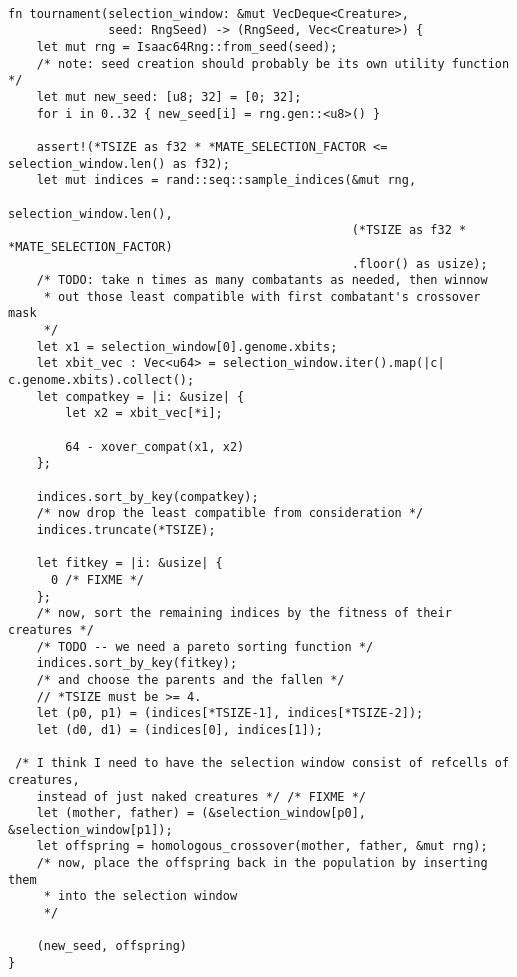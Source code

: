 \documentclass[11pt]{article}
\begin{document}
\lstset{language=rust,label=org98dc541,caption= ,captionpos=b,numbers=none}
\begin{lstlisting}

fn tournament(selection_window: &mut VecDeque<Creature>,
              seed: RngSeed) -> (RngSeed, Vec<Creature>) {
    let mut rng = Isaac64Rng::from_seed(seed);
    /* note: seed creation should probably be its own utility function */
    let mut new_seed: [u8; 32] = [0; 32];
    for i in 0..32 { new_seed[i] = rng.gen::<u8>() }

    assert!(*TSIZE as f32 * *MATE_SELECTION_FACTOR <= selection_window.len() as f32);
    let mut indices = rand::seq::sample_indices(&mut rng,
                                                selection_window.len(),
                                                (*TSIZE as f32 * *MATE_SELECTION_FACTOR)
                                                .floor() as usize);
    /* TODO: take n times as many combatants as needed, then winnow
     * out those least compatible with first combatant's crossover mask
     */
    let x1 = selection_window[0].genome.xbits;
    let xbit_vec : Vec<u64> = selection_window.iter().map(|c| c.genome.xbits).collect();
    let compatkey = |i: &usize| {
        let x2 = xbit_vec[*i];

        64 - xover_compat(x1, x2)
    };

    indices.sort_by_key(compatkey);
    /* now drop the least compatible from consideration */
    indices.truncate(*TSIZE);

    let fitkey = |i: &usize| {
      0 /* FIXME */
    };
    /* now, sort the remaining indices by the fitness of their creatures */
    /* TODO -- we need a pareto sorting function */
    indices.sort_by_key(fitkey);
    /* and choose the parents and the fallen */
    // *TSIZE must be >= 4.
    let (p0, p1) = (indices[*TSIZE-1], indices[*TSIZE-2]);
    let (d0, d1) = (indices[0], indices[1]);

 /* I think I need to have the selection window consist of refcells of creatures, 
    instead of just naked creatures */ /* FIXME */ 
    let (mother, father) = (&selection_window[p0], &selection_window[p1]);
    let offspring = homologous_crossover(mother, father, &mut rng);
    /* now, place the offspring back in the population by inserting them
     * into the selection window
     */

    (new_seed, offspring)
}
\end{lstlisting}
\end{document}

